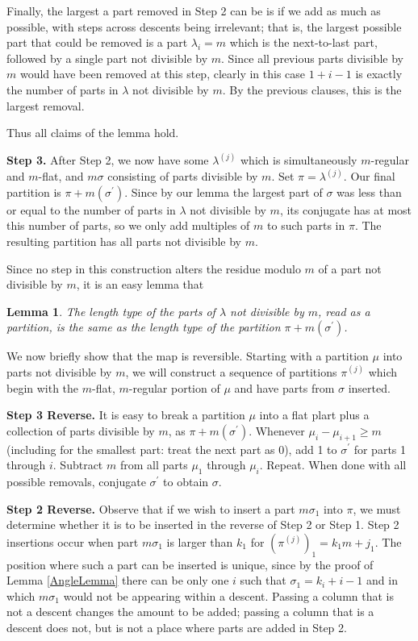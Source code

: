 \documentclass{amsart}
\newtheorem{lemma}{Lemma}
\begin{document}
Finally, the largest a part removed in Step 2 can be is if we add as much as possible, with steps across descents being irrelevant; that is, the largest possible part that could be removed is a part $\lambda_i = m$ which is the next-to-last part, followed by a single part not divisible by $m$.  Since all previous parts divisible by $m$ would have been removed at this step, clearly in this case $1+i-1$ is exactly the number of parts in $\lambda$ not divisible by $m$.  By the previous clauses, this is the largest removal.

Thus all claims of the lemma hold.


\textbf{Step 3.} After Step 2, we now have some $\lambda^{(j)}$ which is simultaneously $m$-regular and $m$-flat, and $m\sigma$ consisting of parts divisible by $m$. Set $\pi = \lambda^{(j)}$.  Our final partition is $\pi+m(\sigma^{\prime}).$  Since by our lemma the largest part of $\sigma$ was less than or equal to the number of parts in $\lambda$ not divisible by $m$, its conjugate has at most this number of parts, so we only add multiples of $m$ to such parts in $\pi$.  The resulting partition has all parts not divisible by $m$.

Since no step in this construction alters the residue modulo $m$ of a part not divisible by $m$, it is an easy lemma that

\begin{lemma} The length type of the parts of $\lambda$ not divisible by $m$, read as a partition, is the same as the length type of the partition $\pi + m (\sigma^\prime)$.
\end{lemma}

We now briefly show that the map is reversible.  Starting with a partition $\mu$ into parts not divisible by $m$, we will construct a sequence of partitions $\pi^{(j)}$ which begin with the $m$-flat, $m$-regular portion of $\mu$ and have parts from $\sigma$ inserted.

\textbf{Step 3 Reverse.} It is easy to break a partition $\mu$ into a flat plart plus a collection of parts divisible by $m$, as $\pi + m(\sigma^{\prime})$.  Whenever $\mu_i - \mu_{i+1} \geq m$ (including for the smallest part: treat the next part as 0), add 1 to $\sigma^{\prime}$ for parts 1 through $i$.  Subtract $m$ from all parts $\mu_1$ through $\mu_i$.  Repeat.  When done with all possible removals, conjugate $\sigma^{\prime}$ to obtain $\sigma$.

\textbf{Step 2 Reverse.}  Observe that if we wish to insert a part $m\sigma_1$ into $\pi$, we must determine whether it is to be inserted in the reverse of Step 2 or Step 1.  Step 2 insertions occur when part $m\sigma_1$ is larger than $k_1$ for $(\pi^{(j)})_1 = k_1 m + j_1$.  The position where such a part can be inserted is unique, since by the proof of Lemma \ref{AngleLemma} there can be only one $i$ such that $\sigma_1 = k_i + i - 1$ and in which $m \sigma_1$ would not be appearing within a descent.  Passing a column that is not a descent changes the amount to be added; passing a column that is a descent does not, but is not a place where parts are added in Step 2.
\end{document}

